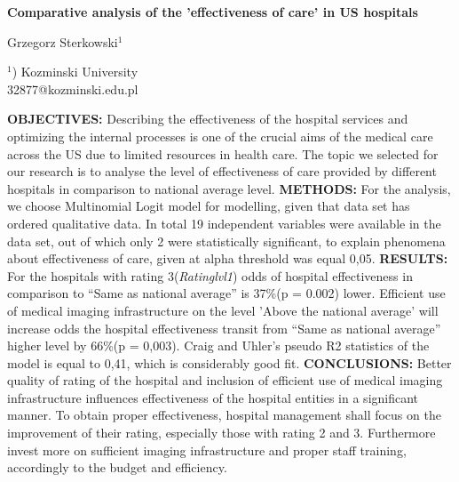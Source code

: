 \documentclass[a4paper]{article}
\begin{document}

\Large
 \begin{center}
\textbf{Comparative analysis of the 'effectiveness of care' in US hospitals}\\ 

\hspace{10pt}

\large
Grzegorz Sterkowski$^1$ \\

\hspace{10pt}

\small  
$^1$) Kozminski University\\
32877@kozminski.edu.pl\\

\end{center}

\hspace{10pt}

\normalsize
\textbf{OBJECTIVES:} Describing the effectiveness of the hospital services and optimizing the internal processes is one of the crucial aims of the medical care across the US due to limited resources in health care. The topic we selected for our research is to analyse the level of effectiveness of care provided by different hospitals in comparison to national average level. \textbf{METHODS:} For the analysis, we choose Multinomial Logit model for modelling, given that data set has ordered qualitative data. In total 19 independent variables were available in the data set, out of which only 2 were statistically significant, to explain phenomena about effectiveness of care, given at alpha threshold was equal 0,05. \textbf{RESULTS:} For the hospitals with rating 3(\textit{Ratinglvl1}) odds of hospital effectiveness in comparison to “Same as national average” is 37\%(p = 0.002) lower. Efficient use of medical imaging infrastructure on the level 'Above the national average' will increase odds the hospital effectiveness transit from “Same as national average” higher level by 66\%(p = 0,003). Craig and Uhler’s pseudo R2 statistics of the model is equal to 0,41, which is considerably good fit. \textbf{CONCLUSIONS:} Better quality of rating of the hospital and inclusion of efficient use of medical imaging infrastructure influences effectiveness of the hospital entities in a significant manner. To obtain proper effectiveness, hospital management shall focus on the improvement of their rating, especially those with rating 2 and 3. Furthermore invest more on sufficient imaging infrastructure and proper staff training, accordingly to the budget and efficiency. 
 
\end{document}
